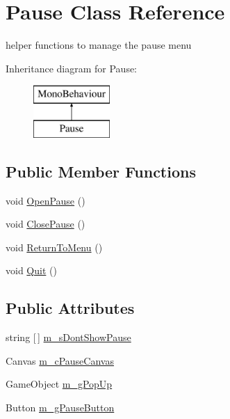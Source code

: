 \hypertarget{class_pause}{}\section{Pause Class Reference}
\label{class_pause}


helper functions to manage the pause menu  


Inheritance diagram for Pause\+:\begin{figure}[H]
\begin{center}
\leavevmode
\includegraphics[height=2.000000cm]{class_pause}
\end{center}
\end{figure}
\subsection*{Public Member Functions}
\begin{DoxyCompactItemize}
\item 
void \mbox{\hyperlink{class_pause_a984765e93c7262d613e53ea6cc8a4982}{Open\+Pause}} ()
\item 
void \mbox{\hyperlink{class_pause_a63448644fd5e8810e48686afcf7e2cb0}{Close\+Pause}} ()
\item 
void \mbox{\hyperlink{class_pause_a5e5184b60b9c781307ba4ab9a9ba4c48}{Return\+To\+Menu}} ()
\item 
void \mbox{\hyperlink{class_pause_a5371367a048d854eba46cf8e2d746776}{Quit}} ()
\end{DoxyCompactItemize}
\subsection*{Public Attributes}
\begin{DoxyCompactItemize}
\item 
string \mbox{[}$\,$\mbox{]} \mbox{\hyperlink{class_pause_accb3db9595822bc864e2cc3efb919316}{m\+\_\+s\+Dont\+Show\+Pause}}
\item 
Canvas \mbox{\hyperlink{class_pause_a73a822c0f3716f9dca81f1409fe105db}{m\+\_\+c\+Pause\+Canvas}}
\item 
Game\+Object \mbox{\hyperlink{class_pause_ae1a91e785fbb89c67a02bff889e8f10d}{m\+\_\+g\+Pop\+Up}}
\item 
Button \mbox{\hyperlink{class_pause_ab91ac58302fc8b019555e830e126747f}{m\+\_\+g\+Pause\+Button}}
\end{DoxyCompactItemize}



